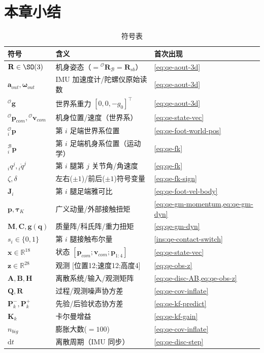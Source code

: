 \section*{本章小结}

\begin{table}[H]\centering\small
\caption{符号表}
\begin{tabular}{lll}
\toprule
符号 & 含义 & 首次出现 \\
\midrule
$\mathbf{R}\in\SO(3)$ & 机身姿态（$={}^{\mathcal{O}}\mathbf{R}_{\mathcal{B}}=\mathbf{R}_{sb}$） & \cref{eq:qe-aout-3d} \\
$\boldsymbol a_{out},\boldsymbol\omega_{out}$ & IMU 加速度计/陀螺仪原始读数 & \cref{eq:qe-aout-3d} \\
${}^{\mathcal{O}}\boldsymbol g$ & 世界系重力 $[0,0,-g_0]^\top$ & \cref{eq:qe-aout-3d} \\
${}^{\mathcal{O}}\boldsymbol p_{com},{}^{\mathcal{O}}\boldsymbol v_{com}$ & 机身位置/速度（世界系） & \cref{eq:qe-state-vec} \\
${}^{\mathcal{O}}_{i}\boldsymbol p$ & 第 $i$ 足端世界系位置 & \cref{eq:qe-foot-world-pos} \\
${}^{\mathcal{B}}_{i}\boldsymbol p$ & 第 $i$ 足端机身系位置（运动学） & \cref{eq:qe-fk} \\
${}_iq^j,{}_i\dot q^j$ & 第 $i$ 腿第 $j$ 关节角/角速度 & \cref{eq:qe-fk} \\
$\zeta,\delta$ & 左右($\pm1$)/前后($\pm1$)符号变量 & \cref{eq:qe-fk-sign} \\
$\mathbf{J}_i$ & 第 $i$ 腿足端雅可比 & \cref{eq:qe-foot-vel-body} \\
$\boldsymbol p,\boldsymbol\tau_K$ & 广义动量/外部接触扭矩 & \cref{eq:qe-gm-momentum,eq:qe-gm-dyn} \\
$\mathbf{M},\mathbf{C},\boldsymbol g(\boldsymbol q)$ & 质量阵/科氏阵/重力扭矩 & \cref{eq:qe-gm-dyn} \\
$s_i\in\{0,1\}$ & 第 $i$ 腿接触布尔量 & \cref{ins:qe-contact-switch} \\
$\boldsymbol x\in\mathbb{R}^{18}$ & 状态 $[\boldsymbol p_{com};\boldsymbol v_{com};\boldsymbol p_{1:4}]$ & \cref{eq:qe-state-vec} \\
$\boldsymbol z\in\mathbb{R}^{28}$ & 观测 [位置12;速度12;高度4] & \cref{eq:qe-obs-z} \\
$\mathbf{A},\mathbf{B},\mathbf{H}$ & 离散系统/输入/观测矩阵 & \cref{eq:qe-disc-AB,eq:qe-obs-z} \\
$\mathbf{Q},\mathbf{R}$ & 过程/观测噪声协方差 & \cref{eq:qe-cov-inflate} \\
$\mathbf{P}_k^-,\mathbf{P}_k^+$ & 先验/后验状态协方差 & \cref{eq:qe-kf-predict} \\
$\mathbf{K}_k$ & 卡尔曼增益 & \cref{eq:qe-kf-gain} \\
$n_{big}$ & 膨胀大数($=100$) & \cref{eq:qe-cov-inflate} \\
$\mathrm{d}t$ & 离散周期（IMU 同步） & \cref{eq:qe-disc-step} \\
\bottomrule
\end{tabular}
\end{table}

